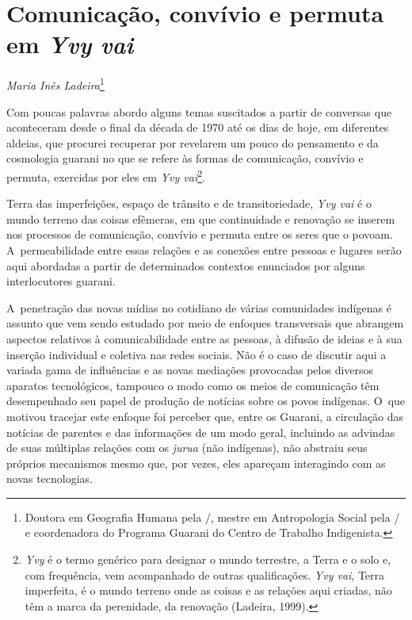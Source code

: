 \thispagestyle{empty}

\chapter*{Comunicação, convívio e permuta em \emph{Yvy vai}}


\begin{flushright}
\emph{Maria Inês Ladeira}\footnote{Doutora em Geografia Humana pela
/, mestre em Antropologia Social pela / e coordenadora do
Programa Guarani do Centro de Trabalho Indigenista.}
\end{flushright}

\noindent Com poucas palavras abordo alguns temas suscitados a partir de conversas
que aconteceram desde o final da década de 1970 até os dias de hoje, em
diferentes aldeias, que procurei recuperar por revelarem um pouco do
pensamento e da cosmologia guarani no que se refere às formas de
comunicação, convívio e permuta, exercidas por eles em \emph{Yvy
vai}\footnote{\emph{Yvy} é o termo genérico para designar o mundo terrestre, a
Terra e o solo e, com frequência, vem acompanhado de outras
qualificações. \emph{Yvy vai}, Terra imperfeita, é o mundo terreno onde as
coisas e as relações aqui criadas, não têm a marca da perenidade, da
renovação (Ladeira, 1999).}. 

Terra das imperfeições, espaço de trânsito e de transitoriedade, \emph{Yvy vai}
é o mundo terreno das coisas efêmeras, em que continuidade e renovação
se inserem nos processos de comunicação, convívio e permuta entre os
seres que o povoam. A~permeabilidade entre essas relações e as conexões
entre pessoas e lugares serão aqui abordadas a partir de determinados
contextos enunciados por alguns interlocutores guarani. 

A~penetração das novas mídias no cotidiano de várias comunidades
indígenas é assunto que vem sendo estudado por meio de enfoques
transversais que abrangem aspectos relativos à comunicabilidade entre
as pessoas, à difusão de ideias e à sua inserção individual e coletiva
nas redes sociais. Não é o caso de discutir aqui a variada gama de
influências e as novas mediações provocadas pelos diversos aparatos
tecnológicos, tampouco o modo como os meios de comunicação têm
desempenhado seu papel de produção de notícias sobre os povos
indígenas. O~que motivou tracejar este enfoque foi perceber que, entre
os Guarani, a circulação das notícias de parentes e das informações de
um modo geral, incluindo as advindas de suas múltiplas relações com os
\emph{jurua} (não indígenas), não abstraiu seus próprios mecanismos mesmo que,
por vezes, eles apareçam interagindo com as novas tecnologias.


